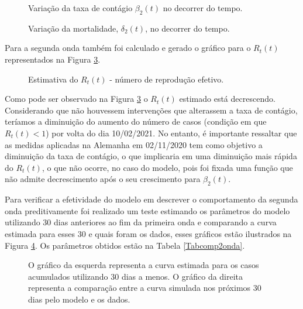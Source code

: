 \documentclass[12pt]{article}
\begin{document}
\begin{figure}[h!]
    \centering
    
    \caption{Variação da taxa de contágio $\beta_2(t)$ no decorrer do tempo.} 
    \label{beta2t}
\end{figure}

\begin{figure}[h!]
    \centering
    
    \caption{Variação da mortalidade, $\delta_2(t)$, no decorrer do tempo.} 
    \label{delta2t}
\end{figure}

Para a segunda onda também foi calculado e gerado o gráfico para o $R_t(t)$ representados na Figura \ref{rt2}.

\begin{figure}[h!]
    \centering
    
    \caption{Estimativa do $R_t(t)$ - número de reprodução efetivo.}
    \label{rt2}
\end{figure}

Como pode ser observado na Figura \ref{rt2} o $R_t(t)$ estimado está decrescendo. Considerando que não houvessem intervenções que alterassem a taxa de contágio, teríamos a diminuição do aumento do número de casos (condição em que $R_t(t) < 1$) por volta do dia 10/02/2021. No entanto, é importante ressaltar que as medidas aplicadas na Alemanha em 02/11/2020 tem como objetivo a diminuição da taxa de contágio, o que implicaria em uma diminuição mais rápida do $R_t(t)$, o que não ocorre, no caso do modelo, pois foi fixada uma função que não admite decrescimento após o seu crescimento para $\beta_2(t)$.



Para verificar a efetividade do modelo em descrever o comportamento da segunda onda preditivamente foi realizado um teste estimando os parâmetros do modelo utilizando $30$ dias anteriores ao fim da primeira onda e comparando a curva estimada para esses $30$ e quais foram os dados, esses gráficos estão ilustrados na Figura \ref{comp2onda}. Os parâmetros obtidos estão na Tabela \ref{Tabcomp2onda}.



\begin{figure}[h!]
    \centering
    
    
    \caption{O gráfico da esquerda representa a curva estimada para os casos acumulados utilizando $30$ dias a menos. O gráfico da direita representa a comparação entre a curva simulada nos próximos $30$ dias pelo modelo e os dados. }
    \label{comp2onda}
\end{figure}
\end{document}
